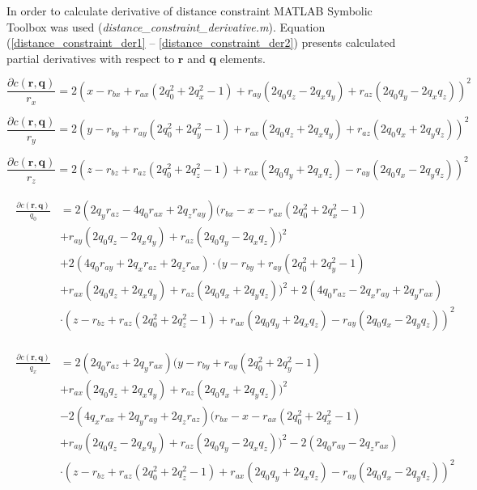 In order to calculate derivative of distance constraint MATLAB Symbolic Toolbox was used \mbox{(\textit{distance\_constraint\_derivative.m})}. Equation (\ref{distance_constraint_der1} -- \ref{distance_constraint_der2}) presents calculated partial derivatives with respect to $\bm{r}$ and $\bm{q}$ elements.

\begin{equation}
	\frac{\partial c(\bm{r}, \bm{q})}{r_x} = 2(x - r_{bx} + r_{ax}(2q_0^2 + 2q_x^2 - 1) + r_{ay}(2q_0q_z - 2q_xq_y) + r_{az}(2q_0q_y - 2q_xq_z))^2 
	\label{distance_constraint_der1}
\end{equation}

\begin{equation}
	\frac{\partial c(\bm{r}, \bm{q})}{r_y} = 2(y - r_{by} + r_{ay}(2q_0^2 + 2q_y^2 - 1) + r_{ax}(2q_0q_z + 2q_xq_y) + r_{az}(2q_0q_x + 2q_yq_z))^2
\end{equation}

\begin{equation}
	\frac{\partial c(\bm{r}, \bm{q})}{r_z} = 2(z - r_{bz} + r_{az}(2q_0^2 + 2q_z^2 - 1) + r_{ax}(2q_0q_y + 2q_xq_z) - r_{ay}(2q_0q_x - 2q_yq_z))^2
\end{equation}

\begin{align}
\begin{split}
	\frac{\partial c(\bm{r}, \bm{q})}{q_0} &= 2(2q_yr_{az} - 4q_0r_{ax} + 2q_zr_{ay})(r_{bx} - x - r_{ax}(2q_0^2 + 2q_x^2 - 1)\\
	&+ r_{ay}(2q_0q_z - 2q_xq_y) + r_{az}(2q_0q_y - 2q_xq_z))^2\\
	&+ 2(4q_0r_{ay} +  2q_xr_{az} + 2q_zr_{ax}) \cdot(y - r_{by} + r_{ay}(2q_0^2 + 2q_y^2 - 1)\\
	&+ r_{ax}(2q_0q_z + 2q_xq_y) + r_{az}(2q_0q_x + 2q_yq_z))^2 + 2(4q_0r_{az} - 2q_xr_{ay} + 2q_yr_{ax})\\
	&\cdot(z - r_{bz} + r_{az}(2q_0^2 + 2q_z^2 - 1) + r_{ax}(2q_0q_y + 2q_xq_z) - r_{ay}(2q_0q_x - 2q_yq_z))^2
\end{split}
\end{align}

\begin{align}
\begin{split}
	\frac{\partial c(\bm{r}, \bm{q})}{q_x} &= 2(2q_0r_{az} + 2q_yr_{ax})(y - r_{by} + r_{ay}(2q_0^2 + 2q_y^2 - 1)\\
	&+ r_{ax}(2q_0q_z + 2q_xq_y) + r_{az}(2q_0q_x + 2q_yq_z))^2\\
	&- 2(4q_xr_{ax} + 2q_yr_{ay} + 2q_zr_{az})(r_{bx} - x - r_{ax}(2q_0^2 + 2q_x^2 - 1)\\
	&+ r_{ay}(2q_0q_z - 2q_xq_y) + r_{az}(2q_0q_y - 2q_xq_z))^2 - 2(2q_0r_{ay} - 2q_zr_{ax})\\
	&\cdot(z - r_{bz} + r_{az}(2q_0^2 + 2q_z^2 - 1) + r_{ax}(2q_0q_y + 2q_xq_z) - r_{ay}(2q_0q_x - 2q_yq_z))^2
\end{split}
\end{align}

